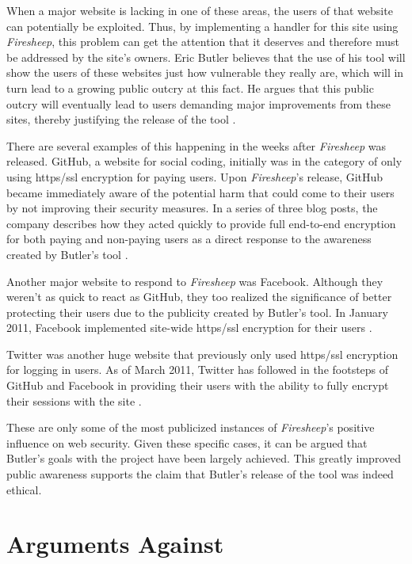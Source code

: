 \documentclass[11pt]{article}
\begin{document}
\begin{multicols}{2}
When a major website is lacking in one of these areas, the users of that website can potentially be exploited. Thus, by implementing a handler for this site using \emph{Firesheep}, this problem can get the attention that it deserves and therefore must be addressed by the site's owners. Eric Butler believes that the use of his tool will show the users of these websites just how vulnerable they really are, which will in turn lead to a growing public outcry at this fact. He argues that this public outcry will eventually lead to users demanding major improvements from these sites, thereby justifying the release of the tool \cite{toorcon_slides}.

There are several examples of this happening in the weeks after \emph{Firesheep} was released. GitHub, a website for social coding, initially was in the category of only using https/ssl encryption for paying users. Upon \emph{Firesheep}'s release, GitHub became immediately aware of the potential harm that could come to their users by not improving their security measures. In a series of three blog posts, the company describes how they acted quickly to provide full end-to-end encryption for both paying and non-paying users as a direct response to the awareness created by Butler's tool \cite{github_reaction}.

Another major website to respond to \emph{Firesheep} was Facebook. Although they weren't as quick to react as GitHub, they too realized the significance of better protecting their users due to the publicity created by Butler's tool. In January 2011, Facebook implemented site-wide https/ssl encryption for their users \cite{facebook_reaction}.

Twitter was another huge website that previously only used https/ssl encryption for logging in users. As of March 2011, Twitter has followed in the footsteps of GitHub and Facebook in providing their users with the ability to fully encrypt their sessions with the site \cite{twitter_reaction}.

These are only some of the most publicized instances of \emph{Firesheep}'s positive influence on web security. Given these specific cases, it can be argued that Butler's goals with the project have been largely achieved. This greatly improved public awareness supports the claim that Butler's release of the tool was indeed ethical.

\section{Arguments Against}

\end{multicols}
\end{document}
